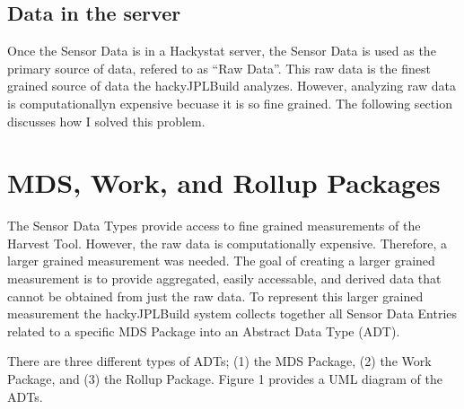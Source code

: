 \subsection{Data in the server}
Once the Sensor Data is in a Hackystat server, the Sensor Data is used as
the primary source of data, refered to as ``Raw Data''.  This raw data is
the finest grained source of data the hackyJPLBuild analyzes.  However,
analyzing raw data is computationallyn expensive becuase it is so fine
grained.  The following section discusses how I solved this problem.


\section{MDS, Work, and Rollup Packages}
The Sensor Data Types provide access to fine grained measurements of the
Harvest Tool.  However, the raw data is computationally expensive.
Therefore, a larger grained measurement was needed.  The goal of creating a
larger grained measurement is to provide aggregated, easily accessable, and
derived data that cannot be obtained from just the raw data.  To represent
this larger grained measurement the hackyJPLBuild system collects together
all Sensor Data Entries related to a specific MDS Package into an Abstract
Data Type (ADT).


There are three different types of ADTs; (1) the 
MDS Package, (2) the Work Package, and (3) the Rollup Package.  Figure 1
provides a UML diagram of the ADTs.


